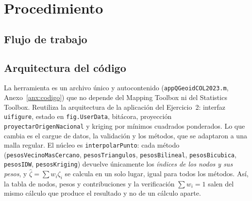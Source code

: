 \documentclass[11pt,letterpaper]{article}
\begin{document}
\section{Procedimiento}
\label{sec:procedimiento}

\subsection{Flujo de trabajo}
\begin{center}\small
{}
\end{center}

\subsection{Arquitectura del código}
\begin{sloppypar}
La herramienta es un archivo único y autocontenido (\texttt{appQGeoidCOL2023.m},
Anexo~\ref{anx:codigo}) que no depende del Mapping Toolbox ni del Statistics Toolbox.
Reutiliza la arquitectura de la aplicación del Ejercicio~2: interfaz \texttt{uifigure}, estado en
\texttt{fig.UserData}, bitácora, proyección \texttt{proyectarOrigenNacional} y kriging
por mínimos cuadrados ponderados. Lo que cambia es el cargue de datos, la validación y los
métodos, que se adaptaron a una malla regular. El núcleo es
\texttt{interpolarPunto}: cada método (\texttt{pesosVecinoMasCercano},
\texttt{pesosTriangulos}, \texttt{pesosBilineal}, \texttt{pesosBicubica},
\texttt{pesosIDW}, \texttt{pesosKriging}) devuelve únicamente los \emph{índices de los
nodos y sus pesos}, y $\hat\zeta=\sum w_i\zeta_i$ se calcula en un solo lugar, igual para
todos los métodos. Así, la tabla de nodos, pesos y contribuciones y la verificación
$\sum w_i=1$ salen del mismo cálculo que produce el resultado y no de un cálculo aparte.
\end{sloppypar}
\end{document}
